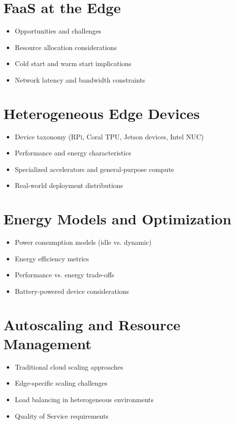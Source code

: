 \documentclass[12pt,a4paper]{report}
\begin{document}
\section{FaaS at the Edge}
\begin{itemize}[leftmargin=1cm]
    \item Opportunities and challenges
    \item Resource allocation considerations
    \item Cold start and warm start implications
    \item Network latency and bandwidth constraints
\end{itemize}

\section{Heterogeneous Edge Devices}
\begin{itemize}[leftmargin=1cm]
    \item Device taxonomy (RPi, Coral TPU, Jetson devices, Intel NUC)
    \item Performance and energy characteristics
    \item Specialized accelerators and general-purpose compute
    \item Real-world deployment distributions
\end{itemize}

\section{Energy Models and Optimization}
\begin{itemize}[leftmargin=1cm]
    \item Power consumption models (idle vs. dynamic)
    \item Energy efficiency metrics
    \item Performance vs. energy trade-offs
    \item Battery-powered device considerations
\end{itemize}

\section{Autoscaling and Resource Management}
\begin{itemize}[leftmargin=1cm]
    \item Traditional cloud scaling approaches
    \item Edge-specific scaling challenges
    \item Load balancing in heterogeneous environments
    \item Quality of Service requirements
\end{itemize}
\end{document}
